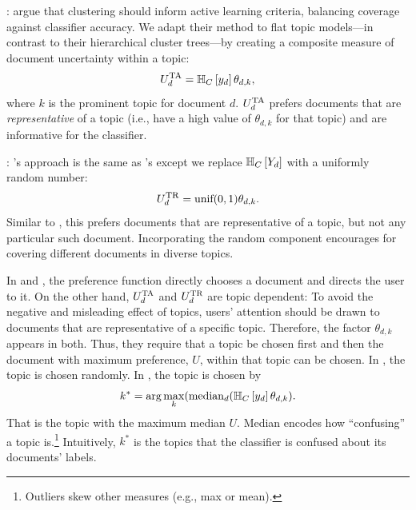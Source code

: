 \noindent
\textbf{}:  argue that clustering should inform
active learning criteria, balancing coverage against classifier accuracy.  We
adapt their method to flat topic models---in contrast to their hierarchical
cluster trees---by creating a composite measure of document uncertainty within a
topic:
\begin{equation}
	U_{d}^{\mbox{\textsc{ta}}} = \mathbb{H}_{C}\left[ y_d \right] \theta_{d,k},
\label{eq:AL_TA}
\end{equation}
where $k$ is the prominent topic for document $d$. $U_d^{\mbox{\textsc{ta}}}$ prefers
documents that are \emph{representative} of a topic
(i.e., have a high value of
$\theta_{d,k}$ for that topic)
and are informative for the classifier.

\noindent
\textbf{}: 's approach is the same as 's
except we replace $\mathbb{H}_{C}\left[ Y_d \right]$ with a uniformly random number:
\begin{equation}\label{eq:AL_TR}
	U_{d}^{\mbox{\textsc{tr}}} = \mbox{unif}(0,1) \theta_{d,k}.
\end{equation}
Similar to , this prefers
documents that are representative of a topic, but not any particular such document. Incorporating the random component encourages for covering different documents in diverse topics.










   In  and , the preference function directly
chooses a document and directs the user to it. On the other hand, $U^{\textsc{TA}}_d$
and $U^{\textsc{TR}}_d$ are topic dependent: To avoid the negative and misleading effect of topics, users' attention should be drawn to documents that are representative of a specific topic. Therefore, the factor $\theta_{d,k}$ appears in
both. Thus, they require that a topic be chosen first and then the document
with maximum preference, $U$, within that topic can be chosen. In , the
topic is chosen randomly. In , the topic is chosen by
\begin{equation}\label{eq:topic_perference}
    k^{*}=\arg\max_k(\mbox{median}_d(\mathbb{H}_{C}\left[ y_d \right] \theta_{d,k}).
\end{equation}
That is the topic with the maximum median $U$. Median encodes how ``confusing'' a topic is.\footnote{Outliers skew other measures (e.g., max or mean).} Intuitively, $k^{*}$ is the topics that the classifier is confused about its documents' labels.

